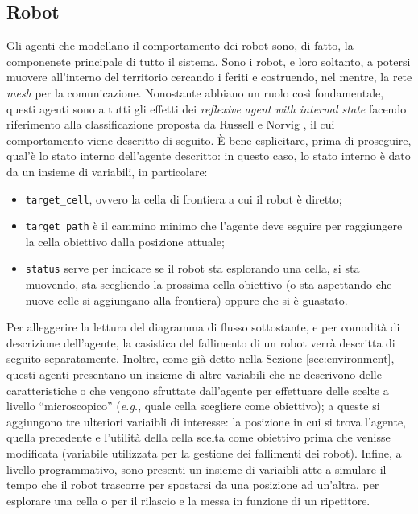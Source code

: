 \subsection{Robot}
\label{sub:robots}
Gli agenti che modellano il comportamento dei robot sono, di fatto, la componenete principale di tutto il sistema.
Sono i robot, e loro soltanto, a potersi muovere all'interno del territorio cercando i feriti e costruendo, nel mentre, la rete \textit{mesh} per la comunicazione. 
Nonostante abbiano un ruolo così fondamentale, questi agenti sono a tutti gli effetti dei \textit{reflexive agent with internal state} facendo riferimento alla classificazione proposta da Russell e Norvig \cite{russell2016}, il cui comportamento viene descritto di seguito.
È bene esplicitare, prima di proseguire, qual'è lo stato interno dell'agente descritto: in questo caso, lo stato interno è dato da un insieme di variabili, in particolare:
\begin{itemize}
	\item \texttt{target\_cell}, ovvero la cella di frontiera a cui il robot è diretto;
	\item \texttt{target\_path} è il cammino minimo che l'agente deve seguire per raggiungere la cella obiettivo dalla posizione attuale;
	\item \texttt{status} serve per indicare se il robot sta esplorando una cella, si sta muovendo, sta scegliendo la prossima cella obiettivo (o sta aspettando che nuove celle si aggiungano alla frontiera) oppure che si è guastato.
\end{itemize}
Per alleggerire la lettura del diagramma di flusso sottostante, e per comodità di descrizione dell'agente, la casistica del fallimento di un robot verrà descritta di seguito separatamente.
Inoltre, come già detto nella Sezione \ref{sec:environment}, questi agenti presentano un insieme di altre variabili che ne descrivono delle caratteristiche o che vengono sfruttate dall'agente per effettuare delle scelte a livello “microscopico” (\textit{e.g.}, quale cella scegliere come obiettivo); a queste si aggiungono tre ulteriori variaibli di interesse: la posizione in cui si trova l'agente, quella precedente e l'utilità della cella scelta come obiettivo prima che venisse modificata (variabile utilizzata per la gestione dei fallimenti dei robot).
Infine, a livello programmativo, sono presenti un insieme di variaibli atte a simulare il tempo che il robot trascorre per spostarsi da una posizione ad un'altra, per esplorare una cella o per il rilascio e la messa in funzione di un ripetitore. 


